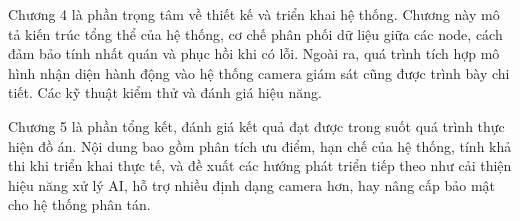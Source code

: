 \documentclass[../main.tex]{subfiles}
\begin{document}
Chương 4 là phần trọng tâm về thiết kế và triển khai hệ thống. Chương này mô tả kiến trúc tổng thể của hệ thống, cơ chế phân phối dữ liệu giữa các node, cách đảm bảo tính nhất quán và phục hồi khi có lỗi. Ngoài ra, quá trình tích hợp mô hình nhận diện hành động vào hệ thống camera giám sát cũng được trình bày chi tiết. Các kỹ thuật kiểm thử và đánh giá hiệu năng.

Chương 5 là phần tổng kết, đánh giá kết quả đạt được trong suốt quá trình thực hiện đồ án. Nội dung bao gồm phân tích ưu điểm, hạn chế của hệ thống, tính khả thi khi triển khai thực tế, và đề xuất các hướng phát triển tiếp theo như cải thiện hiệu năng xử lý AI, hỗ trợ nhiều định dạng camera hơn, hay nâng cấp bảo mật cho hệ thống phân tán.
\end{document}
